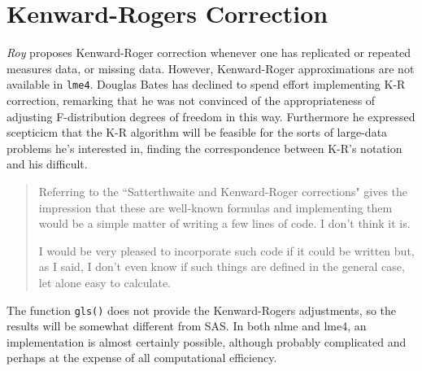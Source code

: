 \documentclass[Main.tex]{subfiles}
\begin{document}
\newpage
\section{Kenward-Rogers Correction}

\textit{Roy} proposes Kenward-Roger correction whenever one has replicated or repeated measures data, or missing data.
However, Kenward-Roger approximations are not available in \texttt{lme4}. Douglas Bates has declined to spend effort implementing K-R correction, remarking that he was not convinced of the appropriateness of adjusting F-distribution degrees of freedom in this way. Furthermore he expressed  scepticicm that the K-R algorithm will be feasible for the sorts of large-data problems he's interested in,
finding the correspondence between K-R's notation and his difficult.

\begin{quotation}
Referring to the ``Satterthwaite and Kenward-Roger corrections" gives
 the impression that these are well-known formulas and implementing
 them would be a simple matter of writing a few lines of code.  I don't
 think it is. 
 
I would be very pleased to incorporate such code if it  could be written but, as I said, I don't even know if such things are defined in the general case, let alone easy to calculate.

\end{quotation}

The function \texttt{gls()} does not provide the Kenward-Rogers adjustments, so the results will be somewhat different from SAS.
In both nlme and lme4, an implementation is almost certainly possible, although probably complicated and perhaps at the expense of all computational efficiency.
\end{document}
